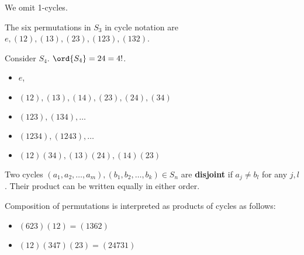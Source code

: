 We omit 1-cycles.

The six permutations in $S_3$ in cycle notation are $e, (12), (13), (23), (123), (132)$.

\begin{example}[cycles of $S_4$]
    Consider $S_4$. $\ord{S_4} = 24 = 4!$.
    \begin{itemize}
        \item $e$,
        \item $(12), (13), (14), (23), (24), (34)$
        \item $(123), (134), \dots$
        \item $(1234), (1243), \dots$
        \item $(12)(34), (13)(24), (14)(23)$
    \end{itemize}
\end{example}

\begin{definition}
    Two cycles $(a_1, a_2, \dots, a_m), (b_1, b_2, \dots, b_k) \in S_n$ are \textbf{disjoint} if $a_j \neq b_l$ for any $j, l$. Their product can be written equally in either order.
\end{definition}

Composition of permutations is interpreted as products of cycles as follows:

\begin{example}[compositions in $S_7$]
    \begin{itemize}
        \item $(623)(12) = (1362)$
        \item $(12)(347)(23) = (24731)$
    \end{itemize}
\end{example}